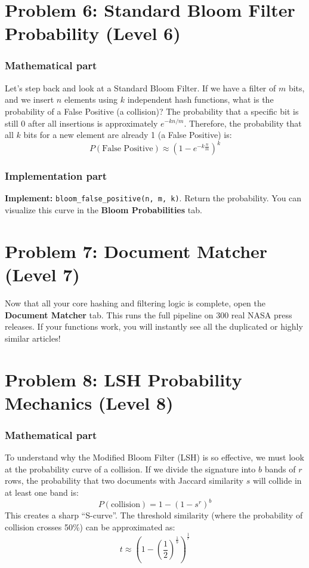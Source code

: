 \documentclass[11pt]{article}
\begin{document}
\section*{Problem 6: Standard Bloom Filter Probability (Level 6)}

\subsubsection*{Mathematical part}
Let's step back and look at a Standard Bloom Filter. If we have a filter of $m$ bits, and we insert $n$ elements using $k$ independent hash functions, what is the probability of a False Positive (a collision)?
The probability that a specific bit is still 0 after all insertions is approximately $e^{-kn/m}$. Therefore, the probability that all $k$ bits for a new element are already 1 (a False Positive) is:
$$ P(\text{False Positive}) \approx \left(1 - e^{-k\frac{n}{m}}\right)^k $$

\subsubsection*{Implementation part}
\textbf{Implement:} \lstinline|bloom_false_positive(n, m, k)|.
Return the probability. You can visualize this curve in the \textbf{Bloom Probabilities} tab.


\section*{Problem 7: Document Matcher (Level 7)}

Now that all your core hashing and filtering logic is complete, open the \textbf{Document Matcher} tab. This runs the full pipeline on 300 real NASA press releases. If your functions work, you will instantly see all the duplicated or highly similar articles!


\section*{Problem 8: LSH Probability Mechanics (Level 8)}

\subsubsection*{Mathematical part}
To understand why the Modified Bloom Filter (LSH) is so effective, we must look at the probability curve of a collision. 
If we divide the signature into $b$ bands of $r$ rows, the probability that two documents with Jaccard similarity $s$ will collide in at least one band is:
$$ P(\text{collision}) = 1 - (1 - s^r)^b $$
This creates a sharp ``S-curve''. The threshold similarity (where the probability of collision crosses 50\%) can be approximated as:
$$ t \approx \left(1 - \left(\frac{1}{2}\right)^{\frac{1}{b}}\right)^{\frac{1}{r}} $$
\end{document}
